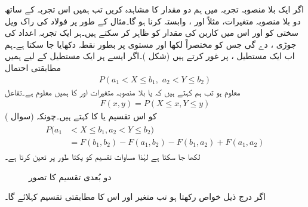 اگر ایک بلا منصوبہ تجربہ میں ہم دو مقدار کا مشاہدہ کریں تب ہمیں اس تجربہ کے ساتھ دو بلا منصوبہ متغیرات، مثلاً  اور ، وابستہ کرنا ہو گا۔مثال کے طور پر فولاد کی راک ویل سختی کو    اور اس میں کاربن کی مقدار کو  ظاہر کر سکتے ہیں۔ہر ایک تجربہ اعداد کی جوڑی ،  دے گی جس کو مختصراً  لکھا اور  مستوی پر بطور نقطہ دکھایا جا سکتا ہے۔ہم اب ایک مستطیل ،  پر غور کرتے ہیں (شکل )۔اگر ایسے ہر ایک مستطیل کے لیے  ہمیں مطابقتی احتمال
\begin{align*}
P(a_1<X\le b_1,\,\, a_2<Y\le b_2)
\end{align*}
معلوم ہو تب ہم کہتے ہیں کہ   یا بلا منصوبہ متغیرات  اور  کا  ہمیں معلوم ہے۔تفاعل
\begin{align}\label{مساوات_شماریات_ایک_سے_زائد_الف}
F(x,y)=P(X\le x,Y\le y)
\end{align}
کو اس تقسیم یا  کا  کہتے ہیں۔چونکہ (سوال )
\begin{gather}
\begin{aligned}\label{مساوات_شماریات_ایک_سے_زائد_ب}
P(a_1&<X\le b_1,a_2<Y\le b_2)\\
&=F(b_1,b_2)-F(a_1,b_2)-F(b_1,a_2)+F(a_1,a_2)
\end{aligned}
\end{gather}
لکھا جا سکتا ہے لہٰذا مساوات  تقسیم کو یکتا طور پر تعین کرتا ہے۔
\begin{figure}
\centering
{}
\caption{دو بُعدی تقسیم کا تصور}
\label{شکل_شماریات_دو_بعدی_تقسیم}
\end{figure}

اگر  درج ذیل خواص رکھتا ہو تب متغیر  اور اس کا مطابقتی تقسیم  کہلائے گا۔


